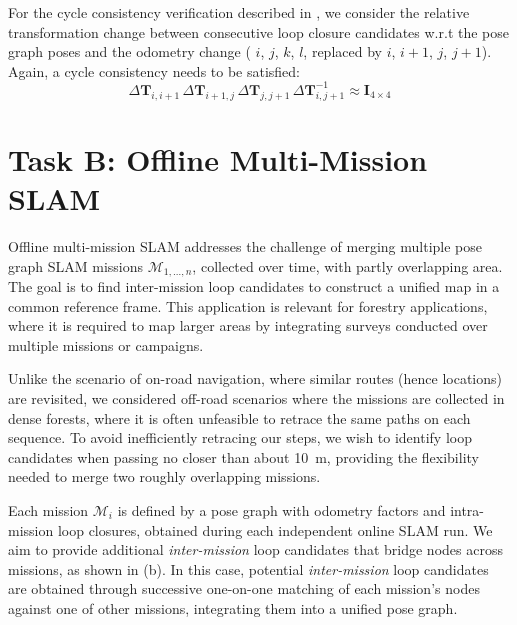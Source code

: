 For the cycle consistency verification described in , we consider the relative transformation change between consecutive loop closure candidates w.r.t the pose graph poses and the odometry change (  $i$, $j$, $k$, $l$, replaced by ${i}$, ${i+1}$, ${j}$, ${j+1}$). Again, a cycle consistency needs to be satisfied:
\begin{equation}
  \label{eq:cycle-online}
  \Delta\mathbf{T}_{i,i+1}\, \Delta\mathbf{T}_{i+1, j}\, \Delta\mathbf{T}_{j, j+1}\, \Delta\mathbf{T}_{i, j+1}^{-1} \approx \mathbf{I}_{4\times4}
\end{equation}


\section{Task B: Offline Multi-Mission SLAM}\label{sec:offline}
Offline multi-mission SLAM addresses the challenge of merging multiple pose graph SLAM missions ${\mathcal{M}_{1, \ldots, n}}$, collected over time, with partly overlapping area. 
The goal is to find inter-mission loop candidates to construct a unified map in a common reference frame. This application is relevant for forestry applications, where it is required to map larger areas by integrating surveys conducted over multiple missions or campaigns.

Unlike the scenario of on-road navigation, where similar routes (hence locations) are revisited, we considered off-road scenarios where the missions are collected in dense forests, where it is often unfeasible to retrace the same paths on each sequence. To avoid inefficiently retracing our steps, we wish to identify loop candidates when passing no closer than about \SI{10}{\meter}, providing the flexibility needed to merge two roughly overlapping missions.

Each mission ${\mathcal{M}_{i}}$ is defined by a pose graph with odometry factors and intra-mission loop closures, obtained during each independent online SLAM run. We aim to provide additional \emph{inter-mission} loop candidates that bridge nodes across missions, as shown in  (b). In this case, potential \emph{inter-mission} loop candidates are obtained through successive one-on-one matching of each mission's nodes against one of other missions, integrating them into a unified pose graph.

